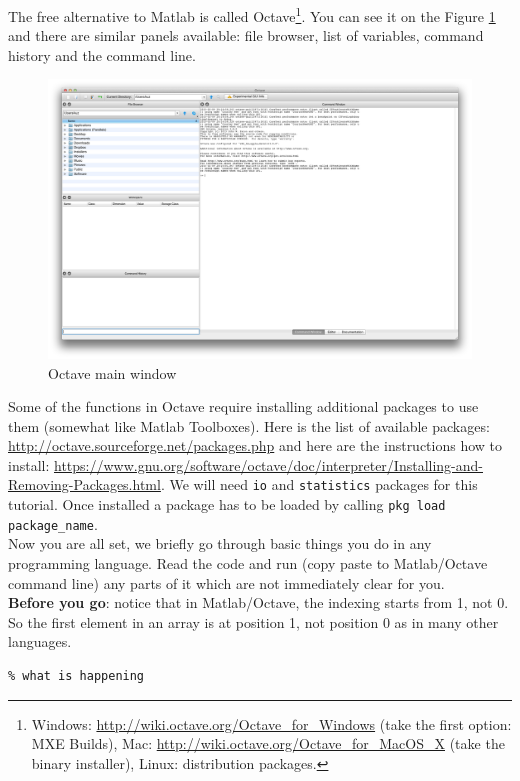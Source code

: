 \documentclass[a4paper,11pt]{article}
\begin{document}
The free alternative to Matlab is called Octave\footnote{Windows: \url{http://wiki.octave.org/Octave_for_Windows} (take the first option: MXE Builds), Mac: \url{http://wiki.octave.org/Octave_for_MacOS_X} (take the binary installer), Linux: distribution packages.}. You can see it on the Figure \ref{fig:octavegui} and there are similar panels available: file browser, list of variables, command history and the command line.

\begin{figure}[H]
   \centering
   \includegraphics[width=1\textwidth]{octave.png} 
   \caption{Octave main window}
   \label{fig:octavegui}
\end{figure}

Some of the functions in Octave require installing additional packages to use them (somewhat like Matlab Toolboxes). Here is the list of available packages: \url{http://octave.sourceforge.net/packages.php} and here are the instructions how to install: \url{https://www.gnu.org/software/octave/doc/interpreter/Installing-and-Removing-Packages.html}. We will need  \texttt{io} and \texttt{statistics} packages for this tutorial. Once installed a package has to be loaded by calling \texttt{pkg load package\_name}.\\

Now you are all set, we briefly go through basic things you do in any programming language. Read the code and run (copy paste to Matlab/Octave command line) any parts of it which are not immediately clear for you.\\


\textbf{Before you go}: notice that in Matlab/Octave, the indexing starts from 1, not 0. So the first element in an array is at position 1, not position 0 as in many other languages.
\vfill
%
%
\begin{lstlisting}[caption = {Comments}]
% This is a comment, write comments to explain tricky parts of code and outline
% what is happening
\end{lstlisting}
\end{document}
